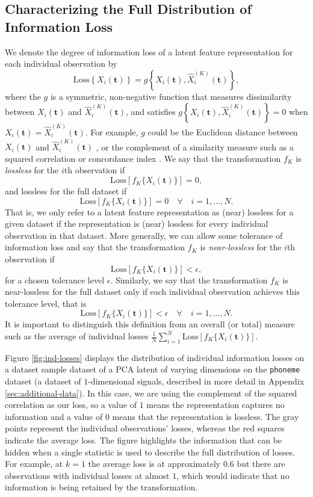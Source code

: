 \subsection{Characterizing the Full Distribution of Information Loss}\label{sec:characterising-information-loss}

We denote the degree of information loss of a latent feature representation for each individual observation by 
$$
\text{Loss} \left\{ X_i(\mathbf{t}) \right\} 
= g\left\{ X_i(\mathbf{t}), \widehat{X}_i^{(K)}(\mathbf{t}) \right\},
$$
where the $g$ is a symmetric, non-negative function that measures dissimilarity between $X_i(\mathbf{t})$ and $\widehat{X}_i^{(K)}(\mathbf{t})$, and satisfies $g\left\{ X_i(\mathbf{t}), \widehat{X}_i^{(K)}(\mathbf{t}) \right\}=0$ when $X_i(\mathbf{t})=\widehat{X}_i^{(K)}(\mathbf{t})$.
For example, $g$ could be the Euclidean distance between $X_i(\mathbf{t})$ and $\widehat{X}_i^{(K)}(\mathbf{t})$ \parencite{morris_comparison_2017}, or the complement of a similarity measure such as a squared correlation or concordance index \parencite{yang_quantile_2020}.
We say that the transformation $f_K$ is \emph{lossless} for the $i$th observation if
$$
\text{Loss} \left[ f_K\{X_i(\mathbf{t})\} \right] = 0,
$$
and lossless for the full dataset if
$$
\text{Loss} \left[ f_K\{X_i(\mathbf{t})\} \right] = 0 \quad \forall \quad  i = 1, \dots, N.
$$
That is, we only refer to a latent feature representation as (near) lossless for a given dataset if the representation is (near) lossless for every individual observation in that dataset.
More generally, we can allow some tolerance of information loss and say that
the transformation $f_K$ is \emph{near-lossless} for the $i$th observation if
$$
\text{Loss} \left[ f_K\{X_i(\mathbf{t})\} \right] < \epsilon,
$$
for a chosen tolerance level $\epsilon$. 
Similarly, we say that the transformation $f_K$ is near-lossless for the full dataset only if each individual observation achieves this tolerance level, that is
$$
\text{Loss} \left[ f_K\{X_i(\mathbf{t})\} \right] < \epsilon \quad \forall \quad  i = 1, \dots, N.
$$
It is important to distinguish this definition from an overall (or total) measure such as the average of individual losses $\frac{1}{N}\sum_{i=1}^N \text{Loss} \left[ f_K\{X_i(\mathbf{t})\} \right]$.

Figure \ref{fig:ind-losses} displays the distribution of individual information losses on a dataset sample dataset of a PCA latent of varying dimensions on the \texttt{phoneme} dataset (a dataset of $1$-dimensional signals, described in more detail in Appendix \ref{sec:additional-data}).
In this case, we are using the complement of the squared correlation as our loss, so a value of $1$ means the representation captures no information and a value of $0$ means that the representation is lossless.
The gray points represent the individual observations' losses, whereas the red squares indicate the average loss.
The figure highlights the information that can be hidden when a single statistic is used to describe the full distribution of losses. For example, at $k = 1$ the average loss is at approximately $0.6$ but there are observations with individual losses at almost $1$, which would indicate that no information is being retained by the transformation.


